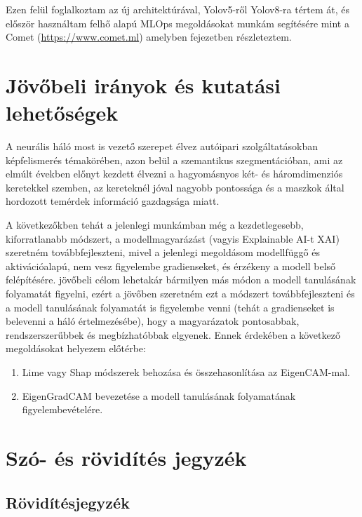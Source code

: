\documentclass[12pt,oneside,a4paper]{article}
\newcommand{\newsection}[1]{\clearpage\section{#1}}\label{makro}
\theoremstyle{remark}
\begin{document}
    Ezen felül foglalkoztam az új architektúrával, Yolov5-ről Yolov8-ra tértem át, és először használtam felhő alapú
    MLOps megoldásokat munkám segítésére mint a Comet (\url{https://www.comet.ml}) amelyben  fejezetben
    részleteztem.

\newsection{Jövőbeli irányok és kutatási lehetőségek}\label{sec:jovobeli-iranyok-es-kutatasi-lehetosegek}
    A  neurális háló most is vezető szerepet élvez autóipari szolgáltatásokban képfelismerés
    témakörében, azon belül a szemantikus szegmentációban, ami az elmúlt években előnyt kezdett élvezni a hagyomásnyos
    két- és háromdimenziós keretekkel szemben, az kereteknél jóval nagyobb pontossága és a maszkok által hordozott
    temérdek információ gazdagsága miatt.

    A következőkben tehát a jelenlegi munkámban még a kezdetlegesebb, kiforratlanabb módszert, a modellmagyarázást (vagyis Explainable AI-t
    \ac{XAI}) szeretném továbbfejleszteni, mivel a jelenlegi megoldásom modellfüggő és aktivációalapú, nem vesz figyelembe gradienseket, és érzékeny a modell belső felépítésére.
    jövőbeli célom lehetakár bármilyen más módon a modell tanulásának folyamatát figyelni, ezért a jövőben szeretném ezt a módszert továbbfejleszteni
    és a modell tanulásának folyamatát is figyelembe venni (tehát a gradienseket is belevenni a háló értelmezésébe), hogy a magyarázatok pontosabbak, rendszerszerűbbek és megbízhatóbbak elgyenek.
    Ennek érdekében a következő megoldásokat helyezem előtérbe:
    \begin{enumerate}
        \item Lime vagy Shap módszerek behozása és összehasonlítása az EigenCAM-mal. \cite{ribeiro-etal-2016-trust,lundberg2017unified}
        \item EigenGradCAM bevezetése a modell tanulásának folyamatának figyelembevételére.
    \end{enumerate}


\printindex\label{ossz:indexjegyzek}

\newsection{Szó- és rövidítés jegyzék}\label{sec:szó-es-rövidités-jegyzék}
\printglossary\label{ossz:glossary}
\newpage
\subsection{Rövidítésjegyzék}\label{subsec:röviditésjegyzék}
\begin{acronym}\label{ossz:roviditesjegyzek}
\end{acronym}
\newpage

\label{ossz:irodalomjegyzek}
\end{document}
